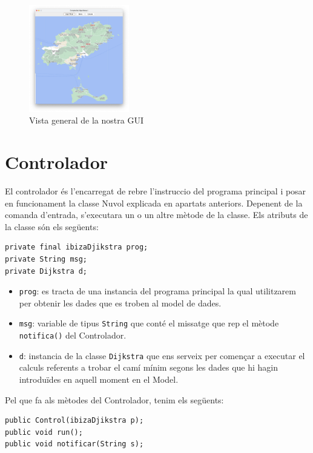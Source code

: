 \documentclass[conference]{IEEEtran}
\begin{document}
\begin{figure}[ht]
    \centering
    \includegraphics[width=0.388\textwidth]{images/GUI.png}
    \caption{Vista general de la nostra GUI}
\end{figure}

\section{Controlador}
El controlador és l'encarregat de rebre l'instruccio  del programa principal i posar en funcionament la classe Nuvol explicada en apartats anteriors. Depenent de la comanda d'entrada, s'executara un o un altre mètode de la classe. Els atributs de la classe són els següents:

\begin{verbatim}
private final ibizaDjikstra prog;
private String msg;
private Dijkstra d;
\end{verbatim}

\begin{itemize}
    \item \texttt{prog}: es tracta de una instancia del programa principal la qual utilitzarem per obtenir les dades que es troben al model de dades.\\
    \item \texttt{msg}: variable de tipus \texttt{String} que conté el missatge que rep el mètode \texttt{notifica()} del Controlador.\\
    \item \texttt{d}: instancia de la classe \texttt{Dijkstra} que ens serveix per començar a executar el calculs referents a trobar el camí mínim segons les dades que hi hagin introduïdes en aquell moment en el Model.\\
\end{itemize}

Pel que fa als mètodes del Controlador, tenim els següents:

\begin{verbatim}
public Control(ibizaDjikstra p);
public void run();
public void notificar(String s);
\end{verbatim}
\end{document}
